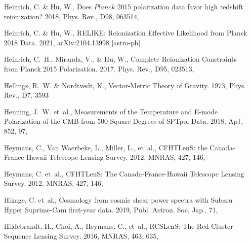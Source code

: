 \documentclass[longauth,traditabstract]{aa}
\def\apj{{ApJ}}
\def\mnras{{MNRAS}}
\begin{document}
\begin{thebibliography}{379}
Heinrich, C. \& Hu, W., {Does $Planck$ 2015 polarization data favor high
  redshift reionization?} 2018, Phys. Rev., D98, 063514, 

Heinrich, C. \& Hu, W., {{RELIKE}}: {{Reionization Effective Likelihood}} from
  {{Planck}} 2018 {{Data}}. 2021, arXiv:2104.13998 [astro-ph]

Heinrich, C.~H., Miranda, V., \& Hu, W., {Complete Reionization Constraints
  from Planck 2015 Polarization}. 2017, Phys. Rev., D95, 023513,

Hellings, R.~W. \& Nordtvedt, K., {Vector-Metric Theory of Gravity}. 1973,
  Phys. Rev., D7, 3593

Henning, J.~W. {et~al.}, {Measurements of the Temperature and E-mode
  Polarization of the CMB from 500 Square Degrees of SPTpol Data}. 2018, \apj,
  852, 97, 

{Heymans}, C., {Van Waerbeke}, L., {Miller}, L., {et~al.}, {CFHTLenS: the
  Canada-France-Hawaii Telescope Lensing Survey}. 2012, \mnras, 427, 146,

Heymans, C. {et~al.}, {CFHTLenS: The Canada-France-Hawaii Telescope Lensing
  Survey}. 2012, \mnras, 427, 146, 

Hikage, C. {et~al.}, {Cosmology from cosmic shear power spectra with Subaru
  Hyper Suprime-Cam first-year data}. 2019, Publ. Astron. Soc. Jap., 71,

{Hildebrandt}, H., {Choi}, A., {Heymans}, C., {et~al.}, {RCSLenS: The Red
  Cluster Sequence Lensing Survey}. 2016, \mnras, 463, 635, 


\end{thebibliography}
\end{document}
